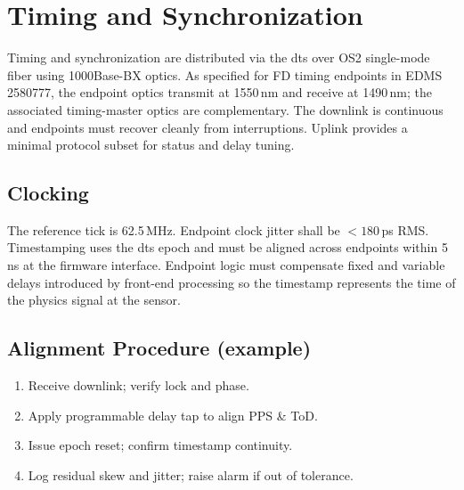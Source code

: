 
\section{Timing and Synchronization}
\label{sec:timing}
Timing and synchronization are distributed via the \gls{dts} over OS2 single-mode fiber using 1000Base-BX optics.
As specified for FD timing endpoints in EDMS 2580777, the endpoint optics transmit at 1550\,nm and receive at 1490\,nm;
the associated timing-master optics are complementary. The downlink is continuous and endpoints
must recover cleanly from interruptions. Uplink provides a minimal protocol subset for status and delay tuning.

\subsection{Clocking}
The reference tick is 62.5\,MHz. Endpoint clock jitter shall be $<180$\,ps RMS. Timestamping uses the \gls{dts} epoch
and must be aligned across endpoints within 5\,ns at the firmware interface. Endpoint logic must compensate fixed and
variable delays introduced by front-end processing so the timestamp represents the time of the physics signal at the sensor.

\subsection{Alignment Procedure (example)}
\begin{enumerate}
  \item Receive downlink; verify lock and phase.
  \item Apply programmable delay tap to align PPS \& ToD.
  \item Issue epoch reset; confirm timestamp continuity.
  \item Log residual skew and jitter; raise alarm if out of tolerance.
\end{enumerate}
